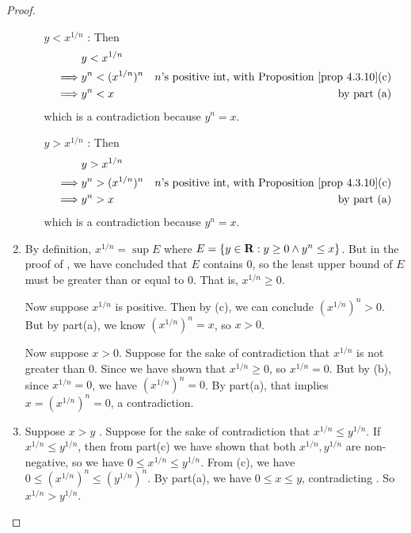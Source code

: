 \begin{proof}
\begin{enumerate}
    \begin{itemize}
        \item[\(y < x^{1/n}\)]:
            Then
            \begin{align*}
                         & y < x^{1/n} \\
                \implies & y^n < (x^{1/n})^n & \text{\(n\)'s positive int, with \PROP{4.3.10}(c)} \\
                \implies & y^n < x & \text{by part (a)}
            \end{align*}
            which is a contradiction because \(y^n = x\).
        \item[\(y > x^{1/n}\)]:
            Then
            \begin{align*}
                         & y > x^{1/n} \\
                \implies & y^n > (x^{1/n})^n & \text{\(n\)'s positive int, with \PROP{4.3.10}(c)} \\
                \implies & y^n > x & \text{by part (a)}
            \end{align*}
            which is a contradiction because \(y^n = x\).
    \end{itemize}
\item
    By definition, \(x^{1/n} = \sup E\) where \(E = \{ y \in \mathbf{R}: y \ge 0 \land y^n \le x \}\).
    But in the proof of , we have concluded that \(E\) contains \(0\), so the least upper bound of \(E\) must be greater than or equal to \(0\).
    That is, \(x^{1/n} \ge 0\).

    Now suppose \(x^{1/n}\) is positive.
    Then by (c), we can conclude \((x^{1/n})^{n} > 0\).
    But by part(a), we know \((x^{1/n})^n = x\), so \(x > 0\).

    Now suppose \(x > 0\).
    Suppose for the sake of contradiction that \(x^{1/n}\) is not greater than \(0\).
    Since we have shown that \(x^{1/n} \ge 0\), so \(x^{1/n} = 0\).
    But by (b), since \(x^{1/n} = 0\), we have \((x^{1/n})^n = 0\).
    By part(a), that implies \(x = (x^{1/n})^n = 0\), a contradiction.
\item
    Suppose \(x > y\) .
    Suppose for the sake of contradiction that \(x^{1/n} \le y^{1/n}\).
    If \(x^{1/n} \le y^{1/n}\), then from part(c) we have shown that both \(x^{1/n}, y^{1/n}\) are non-negative, so we have \(0 \le x^{1/n} \le y^{1/n}\).
    From (c), we have \(0 \le (x^{1/n})^n \le (y^{1/n})^n\).
    By part(a), we have \(0 \le x \le y\), contradicting .
    So \(x^{1/n} > y^{1/n}\).


\end{enumerate}
\end{proof}
